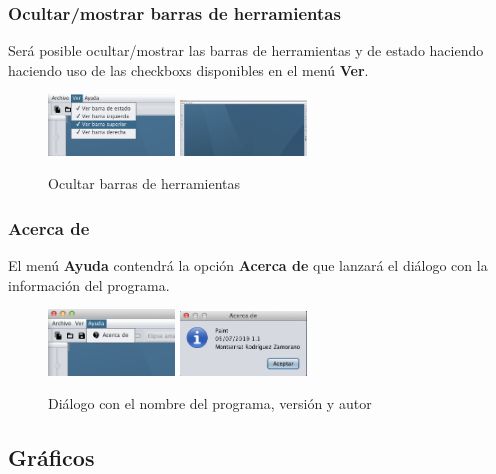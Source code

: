 \subsubsection{Ocultar/mostrar barras de herramientas}
Será posible ocultar/mostrar las barras de herramientas y de estado haciendo haciendo uso de las checkboxs disponibles en el menú \textbf{Ver}.
\vskip0.3cm
\begin{figure}[H]
 \centering
  \includegraphics[width=0.3\textwidth]{generales/ocultarBarras1.png}
  \includegraphics[width=0.3\textwidth]{generales/ocultarBarras2.png}
 \caption{Ocultar barras de herramientas}
 \label{diseño}
 \end{figure}
\subsubsection{Acerca de}
El menú \textbf{Ayuda} contendrá la opción \textbf{Acerca de} que lanzará el diálogo con la información del programa.
\vskip0.3cm
\begin{figure}[H]
 \centering
  \includegraphics[width=0.3\textwidth]{generales/ayuda2.png}
  \includegraphics[width=0.3\textwidth]{generales/ayuda1.png}
 \caption{Diálogo con el nombre del programa, versión y autor}
 \label{diseño}
 \end{figure}
\subsection{Gráficos}

